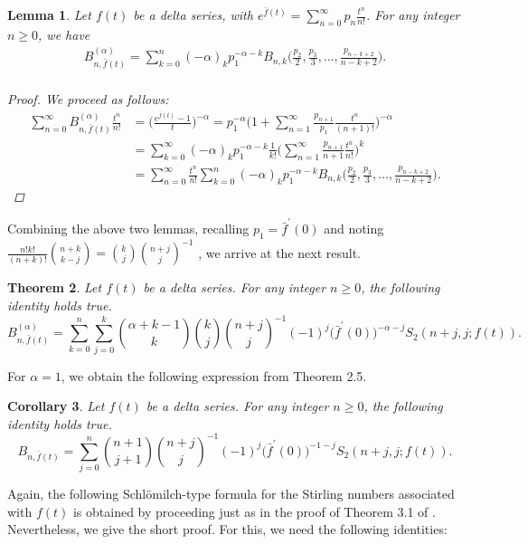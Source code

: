 \documentclass[a4paper,11pt]{amsart}
\newtheorem{theorem}{Theorem}[section]
\newtheorem{lemma}[theorem]{Lemma}
\newtheorem{corollary}[theorem]{Corollary}
\begin{document}
\begin{lemma}
Let $f(t)$ be a delta series, with $e^{\bar{f}(t)}=\sum_{n=0}^{\infty}p_{n}\frac{t^{n}}{n!}$. For any integer $n \ge 0$, we have
\begin{align*}
B_{n,\bar{f}(t)}^{(\alpha)}=\sum_{k=0}^{n}(-\alpha)_{k}p_{1}^{-\alpha-k}B_{n,k}\Big(\frac{p_{2}}{2},\frac{p_{3}}{3},\dots,\frac{p_{n-k+2}}{n-k+2}\Big). \\
\end{align*}
\begin{proof}
We proceed as follows:
\begin{align*}
\sum_{n=0}^{\infty}B_{n,\bar{f}(t)}^{(\alpha)}\frac{t^{n}}{n!}&=\Big(\frac{e^{\bar{f}(t)}-1}{t}\Big)^{-\alpha}=p_{1}^{-\alpha}\Big(1+\sum_{n=1}^{\infty}\frac{p_{n+1}}{p_1}\frac{t^{n}}{(n+1)!}\Big)^{-\alpha} \\
&=\sum_{k=0}^{\infty}(-\alpha)_{k}p_{1}^{-\alpha-k}\frac{1}{k!}\Big(\sum_{n=1}^{\infty}\frac{p_{n+1}}{n+1}\frac{t^{n}}{n!}\Big)^{k} \\
&=\sum_{n=0}^{\infty}\frac{t^{n}}{n!}\sum_{k=0}^{n}(-\alpha)_{k}p_{1}^{-\alpha-k}B_{n,k}\Big(\frac{p_{2}}{2},\frac{p_{3}}{3},\dots,\frac{p_{n-k+2}}{n-k+2}\Big).
\end{align*}
\end{proof}
\end{lemma}
Combining the above two lemmas, recalling $p_{1}=\bar{f}^{\prime}(0)$ and noting $\frac{n!k!}{(n+k)!}\binom{n+k}{k-j}=\binom{k}{j}\binom{n+j}{j}^{-1}$ , we arrive at the next result.
\begin{theorem}
Let $f(t)$ be a delta series. For any integer $n \ge 0$, the following identity holds true.
\begin{equation*}
B_{n,\bar{f}(t)}^{(\alpha)}=\sum_{k=0}^{n}\sum_{j=0}^{k}\binom{\alpha+k-1}{k}\binom{k}{j}\binom{n+j}{j}^{-1}(-1)^{j}\big(\bar{f}^{\prime}(0)\big)^{-\alpha-j}S_{2}(n+j,j; f(t)).
\end{equation*}
\end{theorem}
For $\alpha=1$, we obtain the following expression from Theorem 2.5.
\begin{corollary}
Let $f(t)$ be a delta series. For any integer $n \ge 0$, the following identity holds true.
\begin{equation*}
B_{n,\bar{f}(t)}=\sum_{j=0}^{n}\binom{n+1}{j+1}\binom{n+j}{j}^{-1}(-1)^{j}\big(\bar{f}^{\prime}(0)\big)^{-1-j}S_{2}(n+j,j; f(t)).
\end{equation*}
\end{corollary}
Again, the following Schl\"omilch-type formula for the Stirling numbers associated with $f(t)$ is obtained by proceeding just as in the proof of Theorem 3.1 of \cite{28}. Nevertheless, we give the short proof. For this, we need the following identities:
\end{document}
